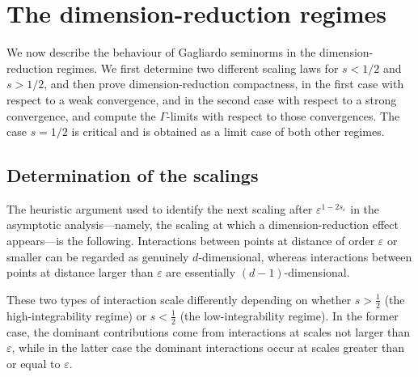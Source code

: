 \documentclass[11pt]{article}
\begin{document}
\section{The dimension-reduction regimes}
We now describe the behaviour of Gagliardo seminorms in the dimension-reduction regimes. We first determine two different scaling laws for $s<1/2$ and $s>1/2$, and then prove dimension-reduction compactness, in the first case with respect to a weak convergence, and in the second case with respect to a strong convergence, and compute the $\Gamma$-limits with respect to those convergences. The case $s=1/2$ is critical and is obtained as a limit case of both other regimes.

\subsection{Determination of the scalings}\label{heu}
The heuristic argument used to identify the next scaling after 
$\varepsilon^{1-2s_\varepsilon}$ in the asymptotic analysis—namely, 
the scaling at which a dimension-reduction effect appears—is the following. 
Interactions between points at distance of order $\varepsilon$ or smaller 
can be regarded as genuinely $d$-dimensional, whereas interactions between 
points at distance larger than $\varepsilon$ are essentially $(d-1)$-dimensional.

These two types of interaction scale differently depending on whether 
$s > \tfrac12$ (the high-integrability regime) or $s < \tfrac12$ 
(the low-integrability regime). In the former case, the dominant 
contributions come from interactions at scales not larger than 
$\varepsilon$, while in the latter case the dominant interactions 
occur at scales greater than or equal to $\varepsilon$.
\end{document}
